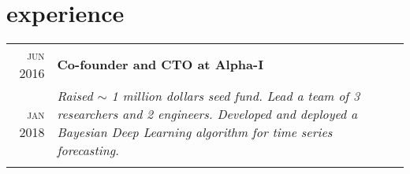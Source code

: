 \documentclass[a4paper,10pt]{article}
\begin{document}
\section{experience}
\begin{tabular}{r|p{11cm}}
\textsc{jun 2016} & \textbf{Co-founder and CTO at Alpha-I} \\
\textsc{jan 2018} & \emph{Raised $\sim$ 1 million dollars seed fund. Lead a team of 3 researchers and 2 engineers. Developed and deployed a Bayesian Deep Learning algorithm for time series forecasting.}\\
&\small{
\begin{itemize}

\end{itemize}}
\end{tabular}
\end{document}
